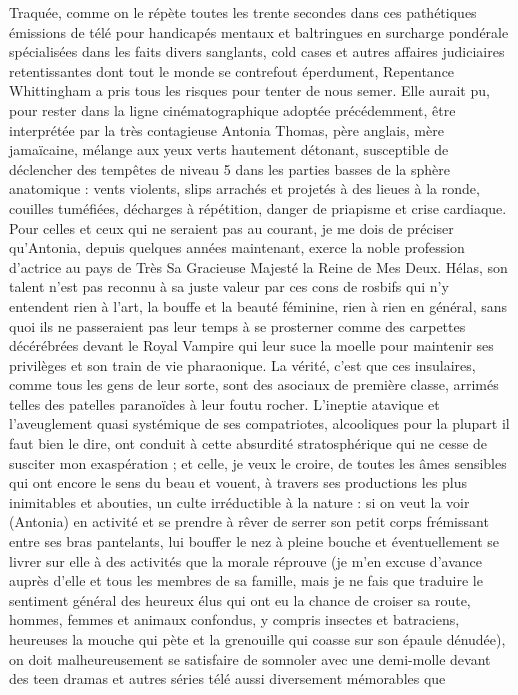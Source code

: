 Traquée, comme on le répète toutes les trente secondes dans ces pathétiques émissions de télé pour handicapés mentaux et baltringues en surcharge pondérale spécialisées dans les faits divers sanglants, cold cases et autres affaires judiciaires retentissantes dont tout le monde se contrefout éperdument, Repentance Whittingham a pris tous les risques pour tenter de nous semer. Elle aurait pu, pour rester dans la ligne cinématographique adoptée précédemment, être interprétée par la très contagieuse Antonia Thomas, père anglais, mère jamaïcaine, mélange aux yeux verts hautement détonant, susceptible de déclencher des tempêtes de niveau 5 dans les parties basses de la sphère anatomique : vents violents, slips arrachés et projetés à des lieues à la ronde, couilles tuméfiées, décharges à répétition, danger de priapisme et crise cardiaque. Pour celles et ceux qui ne seraient pas au courant, je me dois de préciser qu’Antonia, depuis quelques années maintenant, exerce la noble profession d’actrice au pays de Très Sa Gracieuse Majesté la Reine de Mes Deux. Hélas, son talent n’est pas reconnu à sa juste valeur par ces cons de rosbifs qui n’y entendent rien à l’art, la bouffe et la beauté féminine, rien à rien en général, sans quoi ils ne passeraient pas leur temps à se prosterner comme des carpettes décérébrées devant le Royal Vampire qui leur suce la moelle pour maintenir ses privilèges et son train de vie pharaonique. La vérité, c’est que ces insulaires, comme tous les gens de leur sorte, sont des asociaux de première classe, arrimés telles des patelles paranoïdes à leur foutu rocher. L’ineptie atavique et l’aveuglement quasi systémique de ses compatriotes, alcooliques pour la plupart il faut bien le dire, ont conduit à cette absurdité stratosphérique qui ne cesse de susciter mon exaspération ; et celle, je veux le croire, de toutes les âmes sensibles qui ont encore le sens du beau et vouent, à travers ses productions les plus inimitables et abouties, un culte irréductible à la nature : si on veut la voir (Antonia) en activité et se prendre à rêver de serrer son petit corps frémissant entre ses bras pantelants, lui bouffer le nez à pleine bouche et éventuellement se livrer sur elle à des activités que la morale réprouve (je m’en excuse d’avance auprès d’elle et tous les membres de sa famille, mais je ne fais que traduire le sentiment général des heureux élus qui ont eu la chance de croiser sa route, hommes, femmes et animaux confondus, y compris insectes et batraciens, heureuses la mouche qui pète et la grenouille qui coasse sur son épaule dénudée), on doit malheureusement se satisfaire de somnoler avec une demi-molle devant des teen dramas et autres séries télé aussi diversement mémorables que 